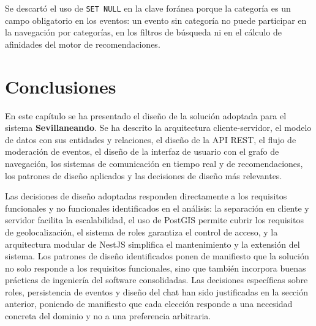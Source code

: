 Se descartó el uso de \texttt{SET NULL} en la clave foránea porque la categoría es un campo obligatorio en los eventos: un evento sin categoría no puede participar en la navegación por categorías, en los filtros de búsqueda ni en el cálculo de afinidades del motor de recomendaciones.

\section{Conclusiones}

En este capítulo se ha presentado el diseño de la solución adoptada para el sistema \textbf{Sevillaneando}. Se ha descrito la arquitectura cliente-servidor, el modelo de datos con sus entidades y relaciones, el diseño de la API REST, el flujo de moderación de eventos, el diseño de la interfaz de usuario con el grafo de navegación, los sistemas de comunicación en tiempo real y de recomendaciones, los patrones de diseño aplicados y las decisiones de diseño más relevantes.

Las decisiones de diseño adoptadas responden directamente a los requisitos funcionales y no funcionales identificados en el análisis: la separación en cliente y servidor facilita la escalabilidad, el uso de PostGIS permite cubrir los requisitos de geolocalización, el sistema de roles garantiza el control de acceso, y la arquitectura modular de NestJS simplifica el mantenimiento y la extensión del sistema. Los patrones de diseño identificados ponen de manifiesto que la solución no solo responde a los requisitos funcionales, sino que también incorpora buenas prácticas de ingeniería del software consolidadas. Las decisiones específicas sobre roles, persistencia de eventos y diseño del chat han sido justificadas en la sección anterior, poniendo de manifiesto que cada elección responde a una necesidad concreta del dominio y no a una preferencia arbitraria.
